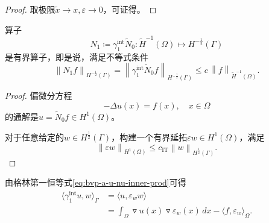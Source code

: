 \begin{proof}

取极限$\widetilde{x} \rightarrow x, \varepsilon \rightarrow 0$，可证得。
\end{proof}

\begin{lemma}
  \label{lemma:bvp-newton-potential-norm}
  算子
  \begin{equation*}
    N_1 \coloneqq \gamma_{1}^{\text{int}} \widetilde{N}_{0} : \widetilde{H}^{-1}(\Omega) \mapsto H^{-\frac{1}{2}}(\Gamma)
  \end{equation*}
  是有界算子，即是说，满足不等式条件
  \begin{equation*}
    \left\| N_{1} f \right\|_{H^{-\frac{1}{2}}(\Gamma)}
    = \left\| \gamma_{1}^{\text{int}} \widetilde{N}_{0} f \right\|_{H^{-\frac{1}{2}}(\Gamma)} \le c \, \left\| f \right\|_{\widetilde{H}^{-1}(\Omega)}.
  \end{equation*}
\end{lemma}

\begin{proof}
  偏微分方程
  \begin{equation*}
    - \Delta u(x) = f(x), \quad x \in \Omega
  \end{equation*}
  的通解是$u = \widetilde{N}_{0} f \in H^{1}(\Omega)$。

  对于任意给定的$w \in H^{\frac{1}{2}}(\Gamma)$，构建一个有界延拓$\varepsilon w \in H^{1}(\Omega)$，满足
  \begin{equation*}
    \left\| \varepsilon w \right\|_{H^{1}(\Omega)} \le c_{\text{IT}} \left\| w \right\|_{H^{\frac{1}{2}}(\Gamma)}.
  \end{equation*}
\end{proof}

由格林第一恒等式\eqref{eq:bvp-a-u-nu-inner-prod}可得
\begin{equation*}
  \begin{split}
    \langle \gamma_{1}^{\text{int}} u , w \rangle_{\Gamma} &=
    \langle u, \varepsilon_{w} w \rangle \\
    &= \int_{\Omega} \triangledown u(x) \triangledown \varepsilon_w (x) \, dx
    - \langle f, \varepsilon_{w} \rangle_{\Omega}.
  \end{split}
\end{equation*}


